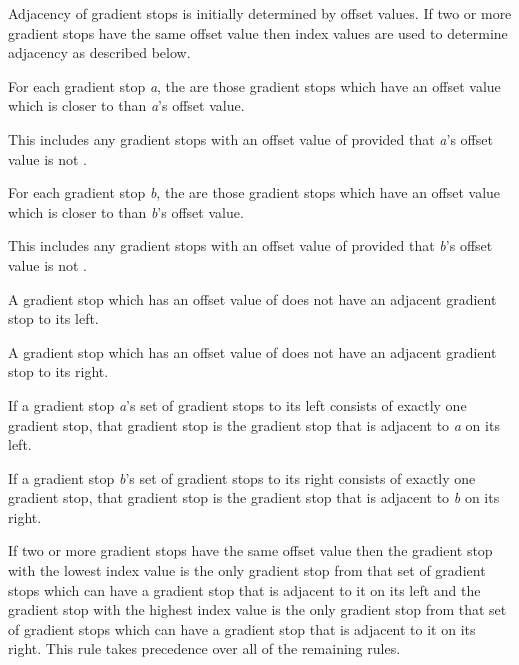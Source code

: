 \begin{enumeratea}
\item Adjacency of gradient stops is initially determined by offset values. If two or more gradient stops have the same offset value then index values are used to determine adjacency as described below.

\item For each gradient stop \textit{a}, the  are those gradient stops which have an offset value which is closer to  than \textit{a}'s offset value.
\begin{note}
This includes any gradient stops with an offset value of  provided that \textit{a}'s offset value is not .
\end{note}

\item For each gradient stop \textit{b}, the  are those gradient stops which have an offset value which is closer to  than \textit{b}'s offset value.
\begin{note}
This includes any gradient stops with an offset value of  provided that \textit{b}'s offset value is not .
\end{note}

\item A gradient stop which has an offset value of  does not have an adjacent gradient stop to its left.

\item A gradient stop which has an offset value of  does not have an adjacent gradient stop to its right.

\item If a gradient stop \textit{a}'s set of gradient stops to its left consists of exactly one gradient stop, that gradient stop is the gradient stop that is adjacent to \textit{a} on its left.

\item If a gradient stop \textit{b}'s set of gradient stops to its right consists of exactly one gradient stop, that gradient stop is the gradient stop that is adjacent to \textit{b} on its right.

\item If two or more gradient stops have the same offset value then the gradient stop with the lowest index value is the only gradient stop from that set of gradient stops which can have a gradient stop that is adjacent to it on its left and the gradient stop with the highest index value is the only gradient stop from that set of gradient stops which can have a gradient stop that is adjacent to it on its right. This rule takes precedence over all of the remaining rules.


\end{enumeratea}
